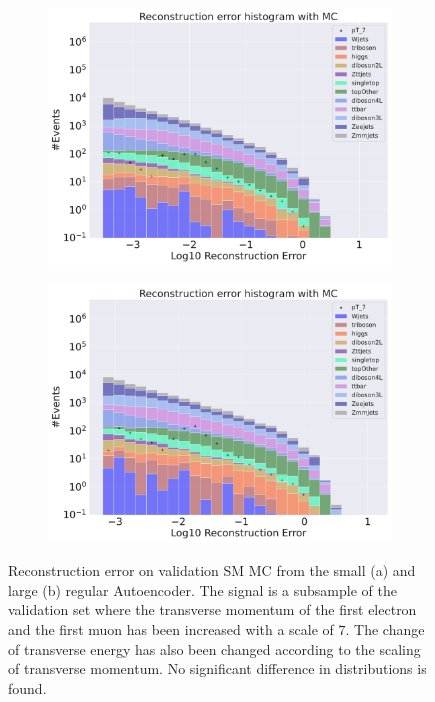 \begin{figure}[H]
    \centering
    \begin{subfigure}{.45\textwidth}
        \includegraphics[width=\textwidth]{Figures/AE_testing/small/b_data_recon_big_rm3_feats_sig_pT_7.pdf}
        \caption{ }
        \label{fig:ae_small_pt_7}
    \end{subfigure}
    \hfill 
    \begin{subfigure}{.45\textwidth}
        \includegraphics[width=\textwidth]{Figures/AE_testing/big/b_data_recon_big_rm3_feats_sig_pT_7.pdf}
        \caption{ }
        \label{fig:ae_big_pt_7}
    \end{subfigure}
    \hfill 
    \caption[AE | Reconstruction error $p_T$ altering of 7]{Reconstruction error on validation SM MC from the small (a) and large (b) regular Autoencoder. The signal is a subsample of the validation 
    set where the transverse momentum of the first electron and the first muon has been increased with a scale of $7$. The change of transverse 
    energy has also been changed according to the scaling of transverse momentum. No significant difference in distributions is found. }
    \label{fig:ae_big_small_pt_7}
\end{figure}

